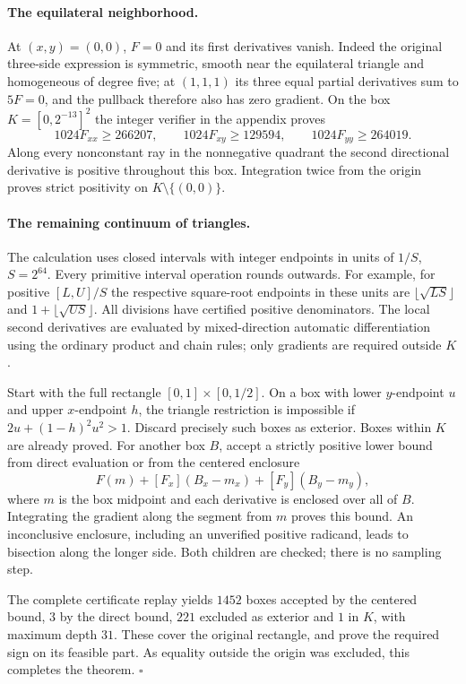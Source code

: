 \documentclass[11pt,a4paper]{article}
\numberwithin{equation}{section}
\theoremstyle{definition}
\theoremstyle{remark}
\begin{document}
\paragraph{The equilateral neighborhood.}
At $(x,y)=(0,0)$, $F=0$ and its first derivatives vanish. Indeed the original three-side expression is symmetric, smooth near the equilateral triangle and homogeneous of degree five; at $(1,1,1)$ its three equal partial derivatives sum to $5F=0$, and the pullback therefore also has zero gradient. On the box $K=[0,2^{-13}]^2$ the integer verifier in the appendix proves
\[
 1024F_{xx}\ge266207,\qquad
 1024F_{xy}\ge129594,\qquad
 1024F_{yy}\ge264019 .
\]
Along every nonconstant ray in the nonnegative quadrant the second directional derivative is positive throughout this box. Integration twice from the origin proves strict positivity on $K\setminus\{(0,0)\}$.

\paragraph{The remaining continuum of triangles.}
The calculation uses closed intervals with integer endpoints in units of $1/S$, $S=2^{64}$. Every primitive interval operation rounds outwards. For example, for positive $[L,U]/S$ the respective square-root endpoints in these units are $\lfloor\sqrt{LS}\rfloor$ and $1+\lfloor\sqrt{US}\rfloor$. All divisions have certified positive denominators. The local second derivatives are evaluated by mixed-direction automatic differentiation using the ordinary product and chain rules; only gradients are required outside $K$.

Start with the full rectangle $[0,1]\times[0,1/2]$. On a box with lower $y$-endpoint $u$ and upper $x$-endpoint $h$, the triangle restriction is impossible if $2u+(1-h)^2u^2>1$. Discard precisely such boxes as exterior. Boxes within $K$ are already proved. For another box $B$, accept a strictly positive lower bound from direct evaluation or from the centered enclosure
\[
 F(m)+[F_x](B_x-m_x)+[F_y](B_y-m_y),
\]
where $m$ is the box midpoint and each derivative is enclosed over all of $B$. Integrating the gradient along the segment from $m$ proves this bound. An inconclusive enclosure, including an unverified positive radicand, leads to bisection along the longer side. Both children are checked; there is no sampling step.

The complete certificate replay yields $1452$ boxes accepted by the centered bound, $3$ by the direct bound, $221$ excluded as exterior and $1$ in $K$, with maximum depth $31$. These cover the original rectangle, and prove the required sign on its feasible part. As equality outside the origin was excluded, this completes the theorem. \hfill$\square$
\end{document}
